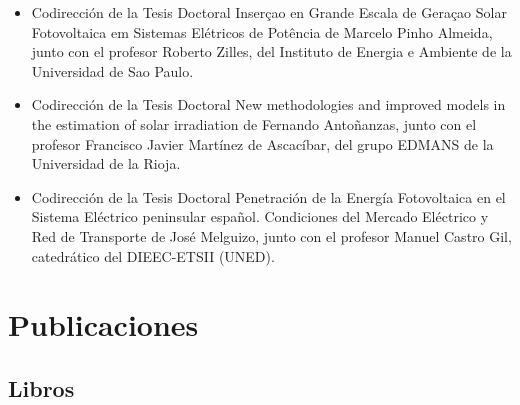 \documentclass[article, a4paper]{memoir}
\begin{document}
\begin{itemize}
\item Codirección de la Tesis Doctoral \guillemotleft{}Inserçao en Grande Escala de Geraçao Solar Fotovoltaica em Sistemas Elétricos de Potência\guillemotright{} de Marcelo Pinho Almeida, junto con el profesor Roberto Zilles, del Instituto de Energia e Ambiente de la Universidad de Sao Paulo.

\item Codirección de la Tesis Doctoral \guillemotleft{}New methodologies and improved models in the estimation of solar irradiation\guillemotright{} de Fernando Antoñanzas, junto con el profesor Francisco Javier Martínez de Ascacíbar, del grupo EDMANS de la Universidad de la Rioja.

\item Codirección de la Tesis Doctoral \guillemotleft{}Penetración de la Energía Fotovoltaica en el Sistema Eléctrico peninsular español. Condiciones del Mercado Eléctrico y Red de Transporte\guillemotright{} de José Melguizo, junto con el profesor Manuel Castro Gil, catedrático del DIEEC-ETSII (UNED).
\end{itemize}


\section{Publicaciones}
\label{sec-5}

\subsection{Libros}
\label{sec-5-1}
\end{document}
